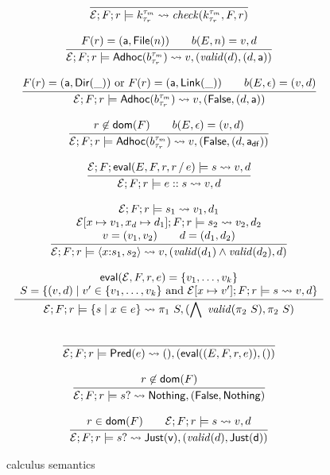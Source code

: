 \documentclass[nocopyrightspace,natbib]{sigplanconf}
\begin{document}
\begin{figure}
\[
\infrule
{ }
{ \Env;F;r \models \Sk \yields \checkk{\Sk}{F}{r} }
{}
\]

\[
\infrule
{ F(r) = (\att,\File{n}) \qquad 
  b(E,n) = v,d }
{ \Env;F;r \models \SAdhoc{b} \yields v,(\valid{d},(d,\att)) }
{ }
\]

\[
\infrule
{ %
  F(r) = (\att,\Dir{\_}) \text{ or } F(r) = (\att,\Link{\_}) \qquad
  b(E,\epsilon) = (v,d)
}
{ \Env;F;r \models \SAdhoc{b} \yields v,(\False,(d,\att)) }
{}
\]

\[
\infrule
{ 
  r \not\in \dom{F}  \qquad
  b(E,\epsilon) = (v,d)
}
{ \Env;F;r \models \SAdhoc{b} \yields v,(\False,(d,\defaultatt)) }
{}
\]

\[
\infrule
{ \Env;F;\eval{E,F,r,\PCons{r}{e}} \models s \yields v,d }
{ \Env;F;r \models \SPath{e}{s} \yields v,d }
{ }
\]

\[
\infrule
{ \begin{array}{c}
  \Env;F;r \models s_1 \yields v_1,d_1 \\
  \Env[x \mapsto v_1, x_d \mapsto d_1];F;r \models s_2 \yields v_2,d_2 \\
  v = (v_1,v_2) \qquad d = (d_1,d_2) 
  \end{array} }
{ \Env;F;r \models \SPair{x}{s_1}{s_2} \yields v,(\valid{d_1} \wedge \valid{d_2}, d) }
{ }
\]

\[
\infrule
{ \begin{array}{c}
  \eval{\Env,F,r,e} = \{ v_1,\dots,v_k \} \\
  S = \Set{ (v,d) \mid v' \in \{ v_1,\dots,v_k \} \text{ and } \Env[x \mapsto v'];F;r \models s \yields v,d }
  \end{array} }
{ \Env;F;r \models \SSetComp{s}{x}{e} \yields \pi_1~S,(\bigwedge~\valid{\pi_2~S}, \pi_2~S) }
{ }
\]


\[
\infrule
{ }
{ \Env;F;r \models \SPred{e} \yields (),(\eval{(E,F,r,e)},()) }
{ }
\]


\[
\infrule
{ r \not\in \dom{F} }
{ \Env;F;r \models \SOption{s} \yields \Nothing,(\False,\Nothing) }
{ }
\]

\[
\infrule
{ r \in \dom{F} \qquad \Env;F;r \models s \yields v,d }
{ \Env;F;r \models \SOption{s} \yields \Just{v},(\valid{d},\Just{d}) }
{ }
\]


\caption{\forest{} calculus semantics}
\label{fig:calculus-semantics}
\end{figure}
\end{document}
